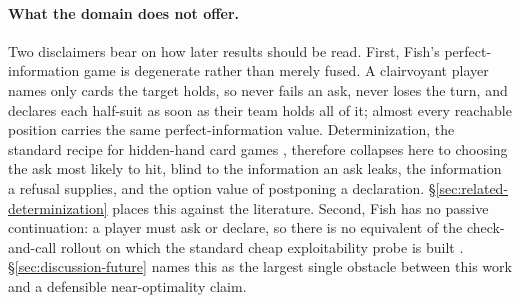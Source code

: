 \paragraph{What the domain does not offer.}
Two disclaimers bear on how later results should be read. First, Fish's perfect-information game is
degenerate rather than merely fused. A clairvoyant player names only cards the target holds, so never
fails an ask, never loses the turn, and declares each half-suit as soon as their team holds all of it;
almost every reachable position carries the same perfect-information value. Determinization, the
standard recipe for hidden-hand card games \cite{levy,ginsberg-gib}, therefore collapses here to
choosing the ask most likely to hit, blind to the information an ask leaks, the information a refusal
supplies, and the option value of postponing a declaration. \S\ref{sec:related-determinization}
places this against the literature. Second, Fish has no passive continuation: a player must ask or
declare, so there is no equivalent of the check-and-call rollout on which the standard cheap
exploitability probe is built \cite{lisy2017lbr}. \S\ref{sec:discussion-future} names this as the
largest single obstacle between this work and a defensible near-optimality claim.
